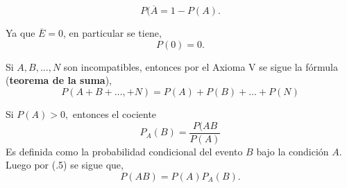 \begin{equation}
    P(\overline{A} = 1-P(A).
\end{equation}

Ya que $\overline{E}=0$, en particular se tiene, 
\begin{equation}
    P(0)=0.
\end{equation}
\vspace{.2cm}

Si $A,B,...,N$ son incompatibles, entonces por el Axioma V se sigue la fórmula (\textbf{teorema de la suma}), 
\begin{equation}
    P(A+B+\ldots,+N) = P(A) + P(B) + \ldots + P(N)
\end{equation}
\vspace{.2cm}

Si $P(A)>0,$ entonces el cociente 
\begin{equation}
    P_A(B)=\dfrac{P(AB}{P(A)}
\end{equation}
Es definida como la probabilidad condicional del evento $B$ bajo la condición $A$.\\
Luego por (.5) se sigue que, 
\begin{equation}
    P(AB)=P(A)P_A(B).
\end{equation}


